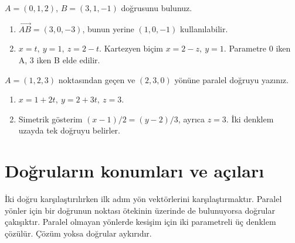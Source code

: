 \begin{tcolorbox}[title={Örnek 2.1 | İki noktadan geçen doğru},colframe=accent]\(A=(0,1,2)\), \(B=(3,1,-1)\) doğrusunu bulunuz.
\par{}\end{tcolorbox}
\begin{tcolorbox}[title={Adım adım çözüm},colback=green!3!white,colframe=green]\begin{enumerate}
\item \(\overrightarrow{AB}=(3,0,-3)\), bunun yerine \((1,0,-1)\) kullanılabilir.
\item \(x=t,\ y=1,\ z=2-t\). Kartezyen biçim \(x=2-z,\ y=1\). Parametre 0 iken A, 3 iken B elde edilir.
\end{enumerate}\end{tcolorbox}
\begin{tcolorbox}[title={Örnek 2.2 | Nokta ve paralel vektör},colframe=accent]\(A=(1,2,3)\) noktasından geçen ve \((2,3,0)\) yönüne paralel doğruyu yazınız.
\par{}\end{tcolorbox}
\begin{tcolorbox}[title={Adım adım çözüm},colback=green!3!white,colframe=green]\begin{enumerate}
\item \(x=1+2t,\ y=2+3t,\ z=3\).
\item Simetrik gösterim \((x-1)/2=(y-2)/3\), ayrıca \(z=3\). İki denklem uzayda tek doğruyu belirler.
\end{enumerate}\end{tcolorbox}
\section{Doğruların konumları ve açıları}
İki doğru karşılaştırılırken ilk adım yön vektörlerini karşılaştırmaktır. Paralel yönler için bir doğrunun noktası ötekinin üzerinde de bulunuyorsa doğrular çakışıktır. Paralel olmayan yönlerde kesişim için iki parametreli üç denklem çözülür. Çözüm yoksa doğrular aykırıdır.


